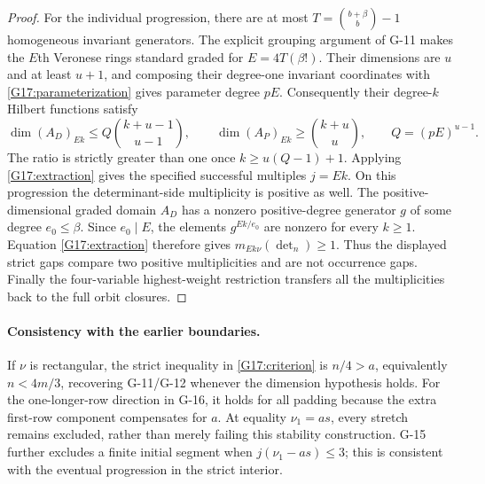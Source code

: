 \begin{proof}
For the individual progression, there are at most
$T=\binom{b+\beta}{b}-1$ homogeneous invariant generators.
The explicit grouping argument of G-11 makes the $E$th Veronese
rings standard graded for $E=4T(\beta!)$.
Their dimensions are $u$ and at least $u+1$, and composing their
degree-one invariant coordinates with \eqref{G17:parameterization}
gives parameter degree $pE$. Consequently their degree-$k$ Hilbert
functions satisfy
\[
 \dim(A_D)_{Ek}\leq Q\binom{k+u-1}{u-1},\qquad
 \dim(A_P)_{Ek}\geq\binom{k+u}{u},\qquad Q=(pE)^{u-1}.
\]
The ratio is strictly greater than one once
$k\geq u(Q-1)+1$. Applying \eqref{G17:extraction} gives the
specified successful multiples $j=Ek$.
On this progression the determinant-side multiplicity is positive as
well. The positive-dimensional graded domain $A_D$ has a nonzero
positive-degree generator $g$ of some degree $e_0\leq\beta$.
Since $e_0\mid E$, the elements $g^{Ek/e_0}$ are nonzero for every
$k\geq1$. Equation \eqref{G17:extraction} therefore gives
$m_{Ek\nu}(\det_n)\geq1$. Thus the displayed strict gaps compare
two positive multiplicities and are not occurrence gaps.
Finally the four-variable highest-weight restriction transfers
all the multiplicities back to the full orbit closures.
\end{proof}

\paragraph{Consistency with the earlier boundaries.}
If $\nu$ is rectangular, the strict inequality in
\eqref{G17:criterion} is $n/4>a$, equivalently $n<4m/3$,
recovering G-11/G-12 whenever the dimension hypothesis holds.
For the one-longer-row direction in G-16, it holds for all padding
because the extra first-row component compensates for $a$.
At equality $\nu_1=as$, every stretch remains excluded, rather
than merely failing this stability construction.
G-15 further excludes a finite initial segment when
$j(\nu_1-as)\leq3$; this is consistent with the eventual
progression in the strict interior.

